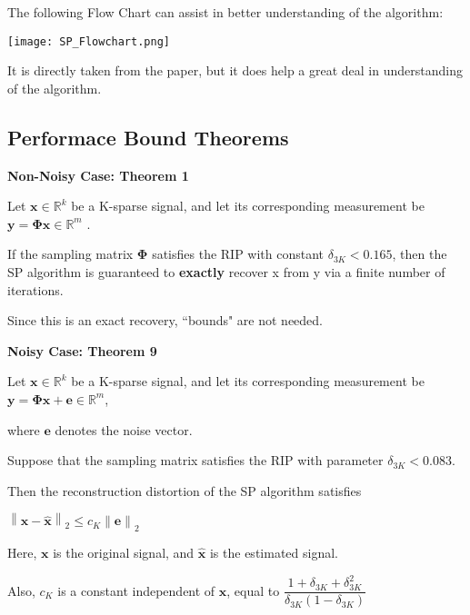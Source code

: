 \documentclass[fleqn, 11pt]{article}
\newcommand{\bs}[1]{\boldsymbol{#1}}
\newcommand\norm[1]{\left\lVert#1\right\rVert}
\newcommand{\R}[0]{\mathbb{R}}
\begin{document}
The following Flow Chart can assist in better understanding of the algorithm: 

\texttt{[image: SP\_Flowchart.png]}

It is directly taken from the paper, but it does help a great deal in  understanding of the algorithm.

\newpage

\subsection*{Performace Bound Theorems }

\medskip

\textbf{Non-Noisy Case: Theorem 1 }

\smallskip

Let $\bs{x} \in \R^k$ be a K-sparse signal, and let
its corresponding measurement be $\bs{y = \Phi x} \in \R^m$ .

\smallskip

If the sampling matrix $\bs{\Phi}$  satisfies the RIP with constant  $\delta_{3K} < 0.165$, then the SP algorithm is guaranteed to \textbf{exactly} recover x from
y via a finite number of iterations.

\smallskip


Since this is an exact recovery, ``bounds" are not needed. 


\hrulefill

\medskip

\textbf{Noisy Case: Theorem 9 }

\smallskip

Let $\bs{x} \in \R^k$ be a K-sparse signal, and let
its corresponding measurement be $\bs{y = \Phi x + e}  \in \R^m$, 

where $\bs{e}$  denotes the noise vector. 

\smallskip

Suppose that the sampling matrix satisfies
the RIP with parameter $\delta_{3K} < 0.083 $.  

\smallskip

Then the reconstruction distortion of the SP algorithm satisfies
\begin{center}
    $\norm{\bs{x - \hat{x}}}_2 \leq c_K \norm{\bs{e}}_2$
\end{center}

Here, $\bs{x}$ is the original signal, and $\bs{\hat{x}}$ is the estimated signal. 

\smallskip

Also, $c_K$ is a constant independent of $\bs{x}$, equal to $\dfrac{1+\delta_{3K}+\delta_{3K}^2}{\delta_{3K}(1-\delta_{3K})}$
\end{document}

